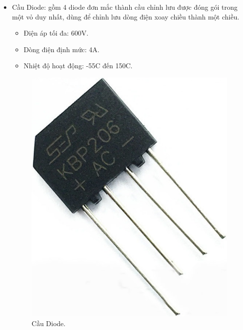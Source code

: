 \documentclass[a4paper,12pt,oneside]{article}
\begin{document}
\begin{enumerate}
\begin{itemize}
\item	Cầu Diode: gồm 4 diode đơn mắc thành cầu chỉnh lưu được đóng gói trong một vỏ duy nhất, dùng để chỉnh lưu dòng điện xoay chiều thành một chiều.
	\begin{itemize}
	\item	Điện áp tối đa: 600V.
	\item	Dòng điện định mức: 4A.
	\item	Nhiệt độ hoạt động: -55\textdegree{}C đến 150\textdegree{}C.
	\end{itemize}
\begin{figure}[H]
\centering
\includegraphics[scale=.3]{hinh/PPM/ppm_caudiode.jpg}
\caption{Cầu Diode\cite{dientuachau}.}
\end{figure}
\end{itemize}
\end{enumerate}
\end{document}
